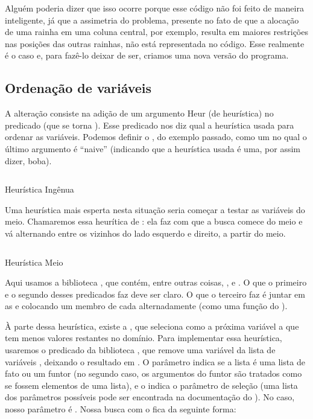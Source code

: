\documentclass{article}
\begin{document}
Alguém poderia dizer que isso ocorre porque esse código não foi feito de maneira inteligente,
já que a assimetria do problema, presente no fato de que a alocação de uma rainha em uma coluna
central, por exemplo, resulta em maiores restrições nas posições das outras rainhas, não está
representada no código. Esse realmente é o caso e, para fazê-lo deixar de ser, criamos uma nova
versão do programa.

\subsection{Ordenação de variáveis}

A alteração consiste na adição de um argumento Heur (de heurística) no predicado  (que se torna
). Esse predicado nos diz qual a heurística usada para ordenar as variáveis.
Podemos definir o , do exemplo passado, como um  no qual o
último argumento é ``naive'' (indicando que a heurística usada é uma, por assim dizer, boba).

    \begin{listing}[!h]
    \inputminted{prolog}{../Exemplos/Cap11/prog2_queensHeurNaive.ecl}
    \caption{Heurística Ingênua}
    \end{listing}

Uma heurística mais esperta nesta situação seria começar a testar as variáveis do meio. Chamaremos
essa heurítica de : ela faz com que a busca comece do meio e vá alternando
entre os vizinhos do lado esquerdo e direito, a partir do meio.

    \begin{listing}[!h]
    \inputminted{prolog}{../Exemplos/Cap11/prog3_queensHeurMout.ecl}
    \caption{Heurística Meio}

    \end{listing}

Aqui usamos a biblioteca , que contém, entre outras coisas, ,
 e . O que o primeiro e o segundo desses predicados faz deve ser
claro. O que o terceiro faz é juntar em  as  e
 colocando um membro de cada alternadamente (como uma função
 do ).

À parte dessa heurística, existe a , que seleciona como a próxima variável a
que tem menos valores restantes no domínio. Para implementar essa heurística, usaremos o predicado
da biblioteca  , que remove uma variável
 da lista de variáveis , deixando o resultado em . O parâmetro 
indica se a lista é uma lista de fato ou um funtor (no segundo caso, os argumentos do funtor são
tratados como se fossem elementos de uma lista), e o  indica o parâmetro de seleção (uma
lista dos parâmetros possíveis pode ser encontrada na documentação do \eclipse). No caso, nosso
parâmetro é . Nossa busca com o  fica da seguinte
forma:
\end{document}
